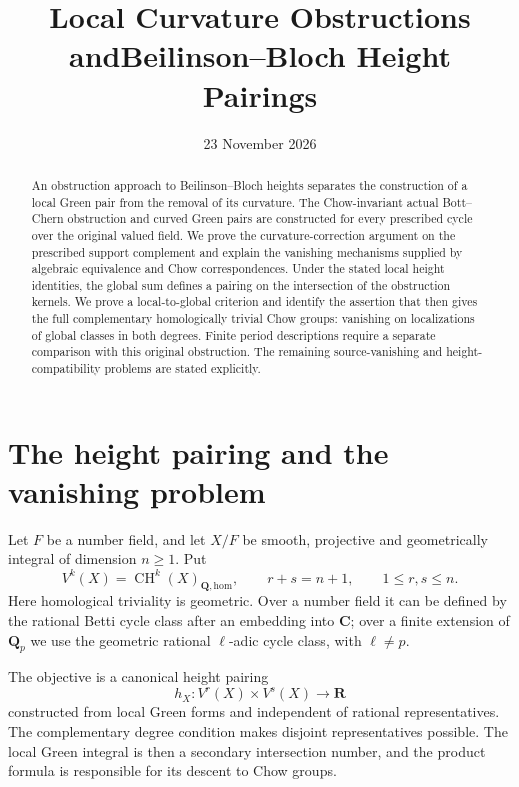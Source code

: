 \documentclass[11pt,a4paper]{article}
\title{Local Curvature Obstructions and\newline Beilinson--Bloch Height Pairings}
\author{}
\date{23 November 2026}
\theoremstyle{definition}
\numberwithin{equation}{section}
\newcommand{\CH}{\operatorname{CH}}
\newcommand{\homol}{\mathrm{hom}}
\newcommand{\Q}{\mathbf Q}
\newcommand{\R}{\mathbf R}
\begin{document}
\maketitle
\begin{abstract}
An obstruction approach to Beilinson--Bloch heights separates the construction of a local Green pair from the removal of its curvature. The Chow-invariant actual Bott--Chern obstruction and curved Green pairs are constructed for every prescribed cycle over the original valued field. We prove the curvature-correction argument on the prescribed support complement and explain the vanishing mechanisms supplied by algebraic equivalence and Chow correspondences. Under the stated local height identities, the global sum defines a pairing on the intersection of the obstruction kernels. We prove a local-to-global criterion and identify the assertion that then gives the full complementary homologically trivial Chow groups: vanishing on localizations of global classes in both degrees. Finite period descriptions require a separate comparison with this original obstruction. The remaining source-vanishing and height-compatibility problems are stated explicitly.
\end{abstract}
\tableofcontents

\section{The height pairing and the vanishing problem}\label{obroute:introduction}

Let $F$ be a number field, and let $X/F$ be smooth, projective and geometrically integral of dimension $n\ge1$. Put
\[
 V^k(X)=\CH^k(X)_{\Q,\homol},\qquad r+s=n+1,
 \qquad 1\le r,s\le n.
\]
Here homological triviality is geometric. Over a number field it can be defined by the rational Betti cycle class after an embedding into $\mathbf C$; over a finite extension of $\Q_p$ we use the geometric rational $\ell$-adic cycle class, with $\ell\ne p$.

The objective is a canonical height pairing
\begin{equation}\label{obroute:target}
 h_X:V^r(X)\times V^s(X)\longrightarrow\R
\end{equation}
constructed from local Green forms and independent of rational representatives. The complementary degree condition makes disjoint representatives possible. The local Green integral is then a secondary intersection number, and the product formula is responsible for its descent to Chow groups.
\end{document}
